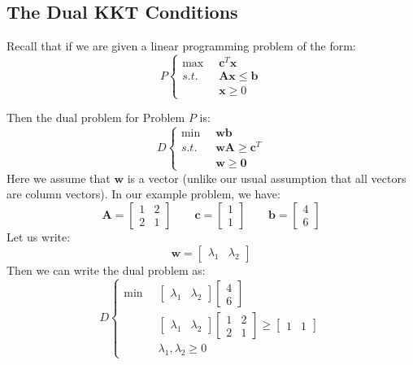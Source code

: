 \subsection{The Dual KKT Conditions}
Recall that if we are given a linear programming problem of the form:
\begin{equation}
P\left\{
\begin{aligned}
\max\;\; & \mathbf{c}^T\mathbf{x}\\
s.t.\;\; & \mathbf{A}\mathbf{x} \leq \mathbf{b}\\
& \mathbf{x} \geq 0
\end{aligned}\right.
\end{equation}

Then the dual problem for Problem $P$ is:
\begin{equation}
D\left\{
\begin{aligned}
\min\;\; & \mathbf{w}\mathbf{b}\\
s.t.\;\; & \mathbf{w}\mathbf{A} \geq \mathbf{c}^T\\
& \mathbf{w} \geq \mathbf{0}
\end{aligned}\right.
\end{equation}
Here we assume that $\mathbf{w}$ is a  vector (unlike our usual assumption that all vectors are column vectors). In our example problem, we have:
\begin{displaymath}
\mathbf{A} = \begin{bmatrix}1 & 2\\2 & 1\end{bmatrix} \quad \quad \mathbf{c} = \begin{bmatrix}1\\1\end{bmatrix} \quad \quad \mathbf{b} = \begin{bmatrix}4\\6\end{bmatrix}
\end{displaymath}
Let us write:
\begin{displaymath}
\mathbf{w} = \begin{bmatrix} \lambda_1 & \lambda_2 \end{bmatrix}
\end{displaymath}
Then we can write the dual problem as:
\begin{displaymath}
D\left\{
\begin{aligned}
\min \;\; & \begin{bmatrix} \lambda_1 & \lambda_2 \end{bmatrix} \begin{bmatrix}4\\6\end{bmatrix} \\
& \begin{bmatrix} \lambda_1 & \lambda_2 \end{bmatrix} \begin{bmatrix}1 & 2\\2 & 1\end{bmatrix} \geq \begin{bmatrix}1 & 1\end{bmatrix}\\
& \lambda_1, \lambda_2 \geq 0
\end{aligned}
\right.
\end{displaymath}
